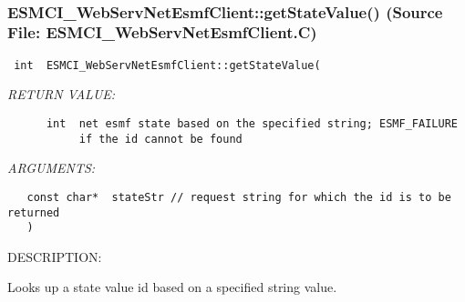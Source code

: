  
\mbox{}\hrulefill\
 
\subsubsection{ESMCI\_WebServNetEsmfClient::getStateValue() (Source File: ESMCI\_WebServNetEsmfClient.C)}


  
\begin{verbatim} int  ESMCI_WebServNetEsmfClient::getStateValue(\end{verbatim}{\em RETURN VALUE:}
\begin{verbatim}      int  net esmf state based on the specified string; ESMF_FAILURE
           if the id cannot be found\end{verbatim}{\em ARGUMENTS:}
\begin{verbatim}   const char*  stateStr // request string for which the id is to be returned
   )\end{verbatim}
{\sf DESCRIPTION:\\ }


      Looks up a state value id based on a specified string value.
  
\setlength{\parskip}{\oldparskip}
\setlength{\parindent}{\oldparindent}
\setlength{\baselineskip}{\oldbaselineskip}
